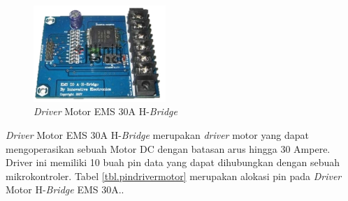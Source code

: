 	\begin{figure}[H]
	\centering
	\includegraphics[width=5cm]{gambar/driver_motor.jpg}
	\caption{\textit{Driver} Motor EMS 30A H-\textit{Bridge}}
	\label{pic.drivermotor}
	\end{figure}

\textit{Driver} Motor EMS 30A H-\textit{Bridge} merupakan \textit{driver} motor yang dapat mengoperasikan sebuah Motor DC dengan batasan arus hingga 30 Ampere. Driver ini memiliki 10 buah pin data yang dapat dihubungkan dengan sebuah mikrokontroler. Tabel \ref{tbl.pindrivermotor} merupakan alokasi pin pada \textit{Driver} Motor H-\textit{Bridge} EMS 30A..

